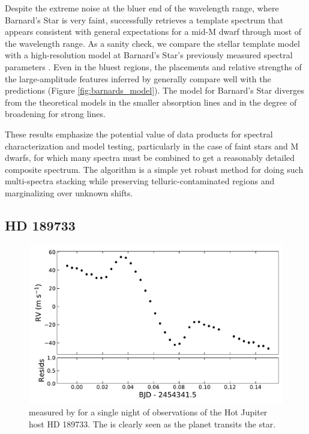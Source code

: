 \documentclass[modern]{aastex62}
\newcommand{\Mdwarf}{Barnard's Star\xspace} %
\begin{document}
Despite the extreme noise at the bluer end of the wavelength range, where \Mdwarf is very faint, \wobble successfully retrieves a template spectrum that appears consistent with general expectations for a mid-M dwarf through most of the \HARPS wavelength range. 
As a sanity check, we compare the \wobble stellar template model with a high-resolution \PHOENIX model at \Mdwarf's previously measured spectral parameters \citep[\teff = 3200 K, \logg = 5.0, and \mh = $-0.5$;][and references therein]{Husser2013, Artigau2018}. 
Even in the bluest regions, the placements and relative strengths of the large-amplitude features inferred by \wobble generally compare well with the \PHOENIX predictions (Figure \ref{fig:barnards_model}). 
The \wobble model for \Mdwarf diverges from the theoretical models in the smaller absorption lines and in the degree of broadening for strong lines.  

These results emphasize the potential value of \wobble data products for spectral characterization and model testing, particularly in the case of faint stars and M dwarfs, for which many spectra must be combined to get a reasonably detailed composite spectrum. 
The \wobble algorithm is a simple yet robust method for doing such multi-spectra stacking while preserving telluric-contaminated regions and marginalizing over unknown \RV shifts.

\subsection{HD 189733}

\begin{figure}
\centering
\includegraphics[width=5in]{hd189_rm}
\caption{\RVs measured by \wobble for a single night of observations of the Hot Jupiter host HD 189733. The \RM is clearly seen as the planet transits the star. }
\label{fig:hd189_rm}
\end{figure}
\end{document}
